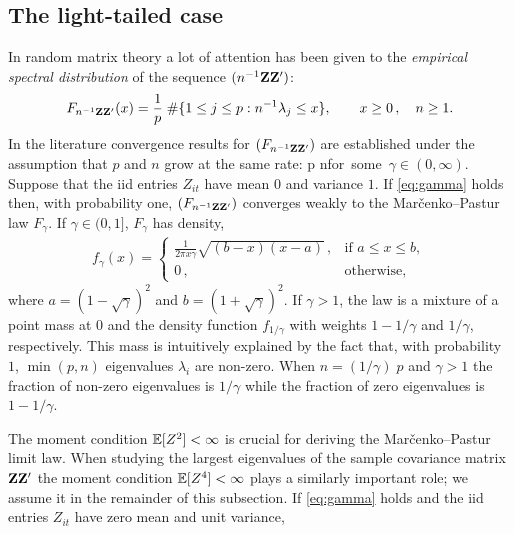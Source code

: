 \subsection{The light-tailed case}
In random matrix theory a lot of attention has been given to the {\em empirical spectral distribution \fct } of 
the sequence $(n^{-1}{\mathbf Z} {\mathbf Z}')$:
\begin{equation*}
F_{n^{-1}{\mathbf Z} {\mathbf Z}'}(x)= \frac{1}{p}\; \# \{ 1\le j\le p : n^{-1} \lambda_j \le x \}, \qquad x\ge 0\,,\quad n\ge1.
\end{equation*}
In the literature convergence results for $(F_{n^{-1}{\mathbf Z} {\mathbf Z}'})$  
are established under the assumption that $p$ and $n$ grow at the same rate:
\beam\label{eq:gamma}
\dfrac p n\to \gamma\qquad \mbox{for some $\gamma \in (0,\infty)$.}
\eeam 
Suppose that the iid entries $Z_{it}$ have mean $0$ and variance $1$. If \eqref{eq:gamma} holds then, with probability one, 
$(F_{n^{-1}{\mathbf Z} {\mathbf Z}'})$ converges weakly to the  Mar\v cenko--Pastur law $F_\gamma$. If $\gamma \in (0,1]$,  $F_\gamma$  has density,
\begin{eqnarray}\label{eq:MP}
f_\gamma(x) =
\left\{\begin{array}{ll}
\frac{1}{2\pi x\gamma} \sqrt{(b-x)(x-a)} \,, & \mbox{if } a\le x \le b, \\
 0 \,, & \mbox{otherwise,}
\end{array}\right.
\end{eqnarray}\noindent
where $a=(1-\sqrt{\gamma})^2$ and $b=(1+\sqrt{\gamma})^2$. If $\gamma>1$, the \MP law is a mixture of a point mass at $0$ and the density function $f_{1/\gamma}$ with weights $1-1/\gamma$ and $1/\gamma$, respectively. 
This  mass is intuitively explained by the fact that, with probability $1$, $\min(p,n)$ 
eigenvalues $\lambda_i$ are non-zero. When $n=(1/\gamma) \; p$ and $\gamma >1$ the fraction of non-zero eigenvalues 
is $1/\gamma$ while the fraction of zero eigenvalues is $1-1/\gamma$.
\par
The moment condition $\mathbb{E}[Z^2]<\infty$ is crucial for deriving the Mar\v cenko--Pastur limit law. 
When studying the largest eigenvalues of the sample covariance matrix ${\mathbf Z}{\mathbf Z}'$ the moment condition $\mathbb{E}[Z^4]<\infty$ plays a similarly 
important role; we assume it in the remainder of this subsection. 
If \eqref{eq:gamma} holds and the iid entries $Z_{it}$ have zero mean and unit variance, %
